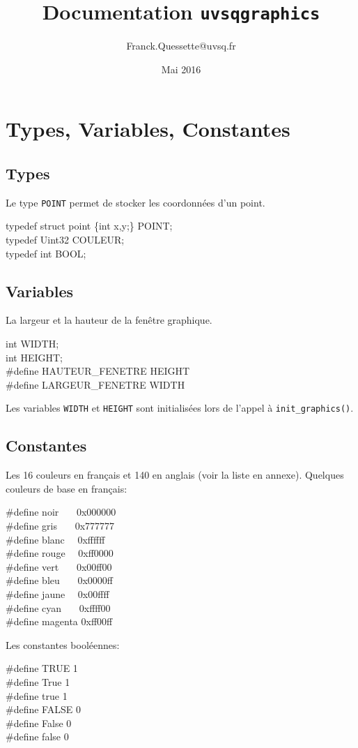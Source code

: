\documentclass{article}
\title{Documentation \texttt{uvsqgraphics}}
\author{Franck.Quessette@uvsq.fr}
\date{Mai 2016}
\newcommand\code[1]{
\begin{mdframed}[linecolor=purple,backgroundcolor=blue!10]
{\tt
#1
}
\end{mdframed}
}
\begin{document}
\maketitle
\tableofcontents

\section{Types, Variables, Constantes}

\subsection{Types}
Le type \texttt{POINT} permet de stocker les coordonnées d'un point.
\code{
typedef struct point \{int x,y;\} POINT; \\
typedef Uint32 COULEUR; \\
typedef int BOOL;
}

\subsection{Variables}
La largeur et la hauteur de la fenêtre graphique.
\code{
int WIDTH; \\
int HEIGHT; \\
\#define HAUTEUR\_FENETRE HEIGHT\\
\#define LARGEUR\_FENETRE WIDTH
}

\noindent
Les variables \texttt{WIDTH} et \texttt{HEIGHT} sont initialisées lors de l'appel à \texttt{init\_graphics()}.

\subsection{Constantes}

Les 16 couleurs en français et 140 en anglais (voir la liste en annexe).
Quelques couleurs de base en français:
\code{
\#define noir~~~ 0x000000 \\
\#define gris~~~ 0x777777 \\
\#define blanc~~ 0xffffff \\
\#define rouge~~ 0xff0000 \\
\#define vert~~~ 0x00ff00 \\
\#define bleu~~~ 0x0000ff \\
\#define jaune~~ 0x00ffff \\
\#define cyan~~~ 0xffff00 \\
\#define magenta 0xff00ff
}

Les constantes booléennes:
\code{
\#define TRUE 1 \\
\#define True 1 \\
\#define true 1 \\
\#define FALSE 0 \\
\#define False 0 \\
\#define false 0 
}
\end{document}
